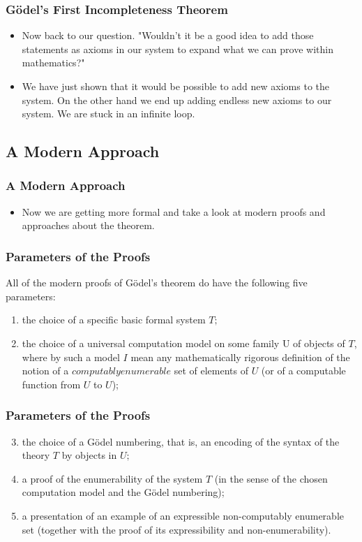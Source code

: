 \documentclass[aspectratio=169]{beamer}
\begin{document}
\begin{frame}
	\frametitle{Gödel's First Incompleteness Theorem}
	\begin{itemize}
		\item Now back to our question. "Wouldn't it be a good idea to add those statements as axioms in our system to expand what we can prove within mathematics?"
		\item We have just shown that it would be possible to add new axioms to the system. On the other hand we end up adding endless new axioms to our system. We are stuck in an infinite loop.
	\end{itemize}
\end{frame}

\subsection{A Modern Approach}
\begin{frame}
	\frametitle{A Modern Approach}
	\begin{itemize}
		\item Now we are getting more formal and take a look at modern proofs and approaches about the theorem.
	\end{itemize}
\end{frame}

\begin{frame}
	\frametitle{Parameters of the Proofs}
	All of the modern proofs of Gödel's theorem do have the following five parameters: \\ \vspace{0.5cm}
	\begin{enumerate}
		\item the choice of a specific basic formal system $T;$
		\item the choice of a universal computation model on some family U of objects of $T$, where by such a model $I$ mean any mathematically rigorous definition of the notion of a $computably enumerable$ set of elements of $U$ (or of a computable function from $U$ to $U$);
	\end{enumerate}
\end{frame}

\begin{frame}
	\frametitle{Parameters of the Proofs}
	\begin{enumerate}
	\setcounter{enumi}{2}
		\item the choice of a Gödel numbering, that is, an encoding of the syntax of the theory $T$ by objects in $U;$
		\item a proof of the enumerability of the system $T$ (in the sense of the chosen computation model and the Gödel numbering);
		\item a presentation of an example of an expressible non-computably enumerable set (together with the proof of its expressibility and non-enumerability).
	\end{enumerate}
	\begin{flushright}
		\cite{bekl}
	\end{flushright}
\end{frame}
\end{document}
